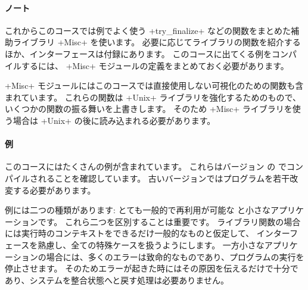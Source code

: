 \paragraph{ノート}

これからこのコースでは例でよく使う \ml+try_finalize+ などの関数をまとめた補助ライブラリ \ml+Misc+ を使います。
必要に応じてライブラリの関数を紹介するほか、インターフェースは付録にあります。
このコースに出てくる例をコンパイルするには、 \ml+Misc+ モジュールの定義をまとめておく必要があります。

\ml+Misc+ モジュールにはこのコースでは直接使用しない可視化のための関数も含まれています。
これらの関数は \ml+Unix+ ライブラリを強化するためのもので、いくつかの関数の振る舞いを上書きします。
そのため \ml+Misc+ ライブラリを使う場合は \ml+Unix+ の後に読み込まれる必要があります。

\paragraph{例}

このコースにはたくさんの例が含まれています。 これらはバージョン \ocamlversion の \ocaml
でコンパイルされることを確認しています。
古いバージョンではプログラムを若干改変する必要があります。

例には二つの種類があります: とても一般的で再利用が可能な  と小さなアプリケーションです。
これら二つを区別することは重要です。
ライブラリ関数の場合には実行時のコンテキストをできるだけ一般的なものと仮定して、
インターフェースを熟慮し、全ての特殊ケースを扱うようにします。
一方小さなアプリケーションの場合には、多くのエラーは致命的なものであり、プログラムの実行を停止させます。
そのためエラーが起きた時にはその原因を伝えるだけで十分であり、システムを整合状態へと戻す処理は必要ありません。
